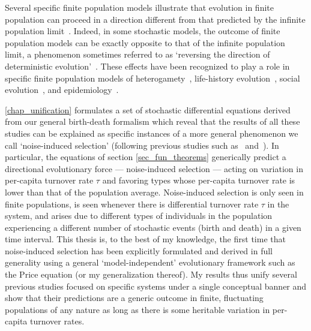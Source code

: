 Several specific finite population models illustrate that evolution in finite population can proceed in a direction different from that predicted by the infinite population limit~\citep{parsons_consequences_2010,melbinger_evolutionary_2010, houchmandzadeh_selection_2012, houchmandzadeh_fluctuation_2015,chotibut_evolutionary_2015,debarre_evolutionary_2016, behar_fluctuations-induced_2016, constable_demographic_2016,veller_drift-induced_2017,abu_awad_effects_2018,parsons_pathogen_2018,mcavoy_public_2018,mcleod_social_2019}. Indeed, in some stochastic models, the outcome of finite population models can be exactly opposite to that of the infinite population limit, a phenomenon sometimes referred to as `reversing the direction of deterministic evolution'~\citep{constable_demographic_2016,mcleod_social_2019, wang_reproductive_2023}. These effects have been recognized to play a role in specific finite population models of heterogamety~\citep{veller_drift-induced_2017,saunders_sex_2018}, life-history evolution~\citep{gillespie_natural_1974,kuosmanen_turnover_2022}, social evolution~\citep{houchmandzadeh_selection_2012,houchmandzadeh_fluctuation_2015,chotibut_evolutionary_2015,constable_demographic_2016,mcleod_social_2019,wang_reproductive_2023}, and epidemiology~\citep{kogan_two-strain_2014,parsons_pathogen_2018,day_price_2020}.

\ref{chap_unification} formulates a set of stochastic differential equations derived from our general birth-death formalism which reveal that the results of all these studies can be explained as specific instances of a more general phenomenon we call `noise-induced selection' (following previous studies such as~\cite{constable_demographic_2016} and~\cite{week_white_2021}). In particular, the equations of section \ref{sec_fun_theorems} generically predict a directional evolutionary force --- noise-induced selection --- acting on variation in per-capita turnover rate $\tau$ and favoring types whose per-capita turnover rate is lower than that of the population average. Noise-induced selection is only seen in finite populations, is seen whenever there is differential turnover rate $\tau$ in the system, and arises due to different types of individuals in the population experiencing a different number of stochastic events (birth and death) in a given time interval. This thesis is, to the best of my knowledge, the first time that noise-induced selection has been explicitly formulated and derived in full generality using a general `model-independent' evolutionary framework such as the Price equation (or my generalization thereof). My results thus unify several previous studies focused on specific systems under a single conceptual banner and show that their predictions are a generic outcome in finite, fluctuating populations of any nature as long as there is some heritable variation in per-capita turnover rates.

